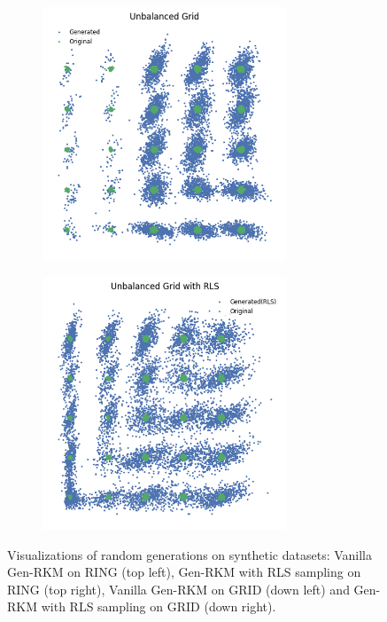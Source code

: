 \begin{figure}[ht]
    \hfill
    \begin{subfigure}{0.45\textwidth}
        \centering
        \includegraphics[width=0.8\textwidth]{Figures/Methods/2dgrid_rkm.png}
    \end{subfigure}
    \hfill
    \begin{subfigure}{0.45\textwidth}
        \centering
        \includegraphics[width=0.8\textwidth]{Figures/Methods/2dgrid_rls.png}
    \end{subfigure}
    \caption{Visualizations of random generations on synthetic datasets: Vanilla Gen-RKM on RING (top left), Gen-RKM with RLS sampling on RING (top right), Vanilla Gen-RKM on GRID (down left) and Gen-RKM with RLS sampling on GRID (down right).}
    \label{2d-rkm-vis}
\end{figure}

